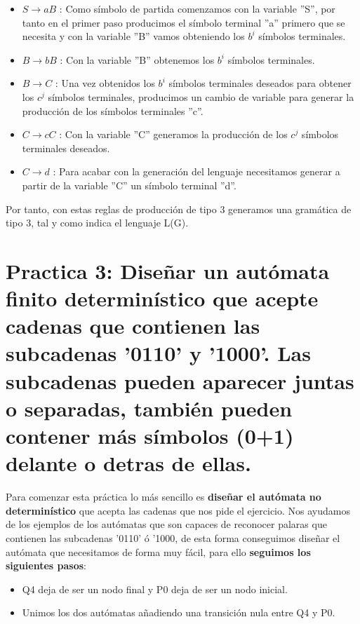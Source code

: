 \begin{itemize}
	\item $S \rightarrow aB$ : Como símbolo de partida comenzamos con la variable ''S'', por tanto en el primer paso producimos el símbolo terminal ''a'' primero que se necesita y con la variable ''B'' vamos obteniendo los $b^{i}$ símbolos terminales.
	\item $B \rightarrow bB$ : Con la variable ''B'' obtenemos los $b^{i}$ símbolos terminales.
	\item $B \rightarrow C$ : Una vez obtenidos los $b^{i}$ símbolos terminales deseados para obtener los $c^{j}$ símbolos terminales, producimos un cambio de variable para generar la producción de los símbolos terminales ''c''. 
	\item $C \rightarrow cC$ : Con la variable ''C'' generamos la producción de los $c^{j}$ símbolos terminales deseados.
	\item $C \rightarrow d$ : Para acabar con la generación del lenguaje necesitamos generar a partir de la variable ''C'' un símbolo terminal ''d''.
\end{itemize}
Por tanto, con estas reglas de producción de tipo 3 generamos una gramática de tipo 3, tal y como indica el lenguaje L(G).

\section{Practica 3: Diseñar un autómata finito determinístico que acepte cadenas que contienen las subcadenas '0110' y '1000'. Las subcadenas pueden aparecer juntas o separadas, también pueden contener más símbolos (0+1) delante o detras de ellas.}

Para comenzar esta práctica lo más sencillo es\textbf{ diseñar el autómata no determinístico} que acepta las cadenas que nos pide el ejercicio. Nos ayudamos de los ejemplos de los autómatas que son capaces de reconocer palaras que contienen las subcadenas '0110' ó '1000, de esta forma conseguimos diseñar el autómata que necesitamos de forma muy fácil, para ello \textbf{seguimos los siguientes pasos}:

\begin{itemize}
	\item Q4 deja de ser un nodo final y P0 deja de ser un nodo inicial.
	\item Unimos los dos autómatas añadiendo una transición nula entre Q4 y P0.
	
\end{itemize}

